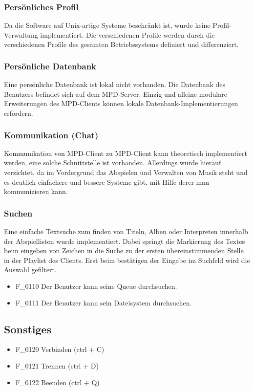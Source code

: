 \subsubsection{Persönliches Profil}
Da die Software auf Unix-artige Systeme beschränkt ist, wurde keine Profil-Verwaltung implementiert. Die
verschiedenen Profile werden durch die verschiedenen Profile des gesamten Betriebssystems definiert und differenziert.
\subsubsection{Persönliche Datenbank}
Eine persönliche Datenbank ist lokal nicht vorhanden. Die Datenbank des Benutzers befindet sich auf dem MPD-Server.
Einzig und alleine modulare Erweiterungen des MPD-Clients können lokale Datenbank-Implementierungen erfordern.
\subsubsection{Kommunikation (Chat)}
Kommunikation von MPD-Client zu MPD-Client kann theoretisch implementiert werden, eine solche Schnittstelle ist vorhanden.
Allerdings wurde hierauf verzichtet, da im Vordergrund das Abspielen und Verwalten von Musik steht und es deutlich
einfachere und bessere Systeme gibt, mit Hilfe derer man kommunizieren kann.
\subsubsection{Suchen}
Eine einfache Textsuche zum finden von Titeln, Alben oder Interpreten innerhalb der Abspiellisten wurde implementiert.
Dabei springt die Markierung des Textes beim eingeben von Zeichen in die Suche zu der ersten übereinstimmenden
Stelle in der Playlist des Clients. Erst beim bestätigen der Eingabe im Suchfeld wird die Auswahl gefiltert.
\begin{itemize}
        \item F\_0110 Der Benutzer kann seine Queue durchsuchen.
	\item F\_0111 Der Benutzer kann sein Dateisystem durchsuchen.
\end{itemize}
\subsection{Sonstiges}
\begin{itemize}
	\item F\_0120 Verbinden		(ctrl + C)
	\item F\_0121 Trennen		(ctrl + D)
	\item F\_0122 Beenden		(ctrl + Q)
\end{itemize}
